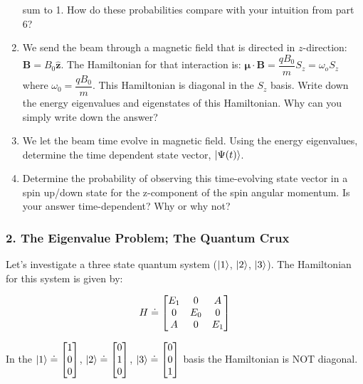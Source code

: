\documentclass[
]{article}
\begin{document}
\begin{enumerate}
  sum to 1. How do these probabilities compare with your intuition from
  part 6?
\item
  We send the beam through a magnetic field that is directed in
  \(z\)-direction: \(\mathbf{B} = B_0\hat{\mathbf{z}}\). The Hamiltonian
  for that interaction is:
  \(\mathbf{\mu}\cdot \mathbf{B} = \dfrac{qB_0}{m}S_z = \omega_o S_z\)
  where \(\omega_0 = \dfrac{qB_0}{m}\). This Hamiltonian is diagonal in
  the \(S_z\) basis. Write down the energy eigenvalues and eigenstates
  of this Hamiltonian. Why can you simply write down the answer?
\item
  We let the beam time evolve in magnetic field. Using the energy
  eigenvalues, determine the time dependent state vector,
  \(\ket{\Psi(t)}\).
\item
  Determine the probability of observing this time-evolving state vector
  in a spin up/down state for the z-component of the spin angular
  momentum. Is your answer time-dependent? Why or why not?
\end{enumerate}

\hypertarget{the-eigenvalue-problem-the-quantum-crux}{%
\subsubsection{2. The Eigenvalue Problem; The Quantum
Crux}\label{the-eigenvalue-problem-the-quantum-crux}}

Let's investigate a three state quantum system (\(\ket{1}\),
\(\ket{2}\), \(\ket{3}\)). The Hamiltonian for this system is given by:

\[H \doteq \begin{bmatrix} E_1 & 0 & A \cr 0 & E_0 & 0 \cr A & 0 & E_1 \end{bmatrix}\]

In the \(\ket{1} \doteq \begin{bmatrix} 1 \cr 0 \cr 0 \end{bmatrix}\),
\(\ket{2} \doteq \begin{bmatrix} 0 \cr 1 \cr 0 \end{bmatrix}\),
\(\ket{3} \doteq \begin{bmatrix} 0 \cr 0 \cr 1 \end{bmatrix}\) basis the
Hamiltonian is NOT diagonal.
\end{document}
